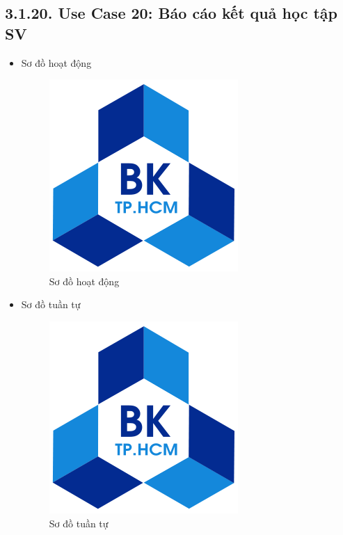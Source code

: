 \subsection*{3.1.20. Use Case 20: Báo cáo kết quả học tập SV}
\begin{itemize}
    \item Sơ đồ hoạt động
    \begin{figure}[H]
    \centering
    \includegraphics[scale=0.5 ]{Picture/hcmut.png}
    \caption{Sơ đồ hoạt động }
    \end{figure}
    \item Sơ đồ tuần tự
    \begin{figure}[H]
    \centering
    \includegraphics[scale=0.5 ]{Picture/hcmut.png}
    \caption{Sơ đồ tuần tự }
    \end{figure}
\end{itemize}
